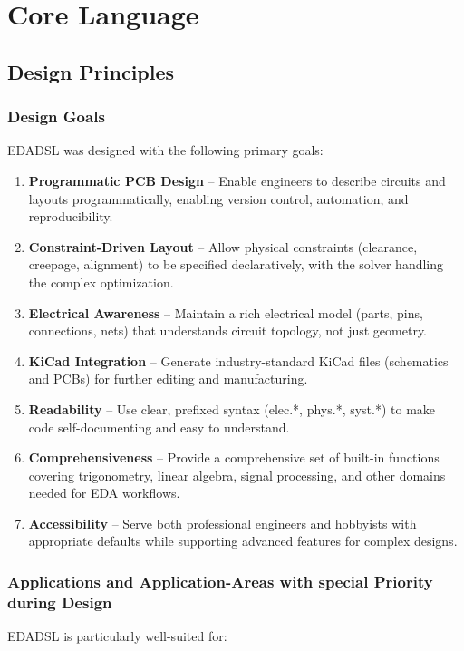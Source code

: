 \part{Core Language}
\chapter{Design Principles}
\section{Design Goals}
EDADSL was designed with the following primary goals:

\begin{enumerate}
\item \textbf{Programmatic PCB Design} -- Enable engineers to describe circuits and layouts programmatically, enabling version control, automation, and reproducibility.

\item \textbf{Constraint-Driven Layout} -- Allow physical constraints (clearance, creepage, alignment) to be specified declaratively, with the solver handling the complex optimization.

\item \textbf{Electrical Awareness} -- Maintain a rich electrical model (parts, pins, connections, nets) that understands circuit topology, not just geometry.

\item \textbf{KiCad Integration} -- Generate industry-standard KiCad files (schematics and PCBs) for further editing and manufacturing.

\item \textbf{Readability} -- Use clear, prefixed syntax (elec.*, phys.*, syst.*) to make code self-documenting and easy to understand.

\item \textbf{Comprehensiveness} -- Provide a comprehensive set of built-in functions covering trigonometry, linear algebra, signal processing, and other domains needed for EDA workflows.

\item \textbf{Accessibility} -- Serve both professional engineers and hobbyists with appropriate defaults while supporting advanced features for complex designs.
\end{enumerate}

\section{Applications and Application-Areas with special Priority during Design}
EDADSL is particularly well-suited for:


